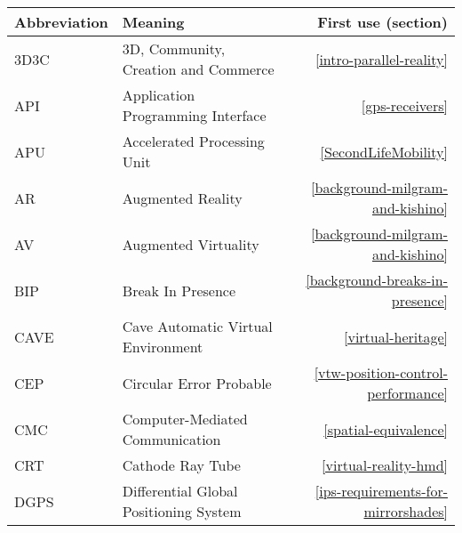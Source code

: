 
\begin{center}
\begin{longtable}{l p{8cm} r}




\toprule

\textbf{Abbreviation} & \centering \textbf{Meaning} & \textbf{First use (section)} \\

\midrule


3D3C & \centering 3D, Community, Creation and Commerce & \ref{intro-parallel-reality} \\

API & \centering Application Programming Interface & \ref{gps-receivers} \\

APU & \centering Accelerated Processing Unit & \ref{SecondLifeMobility} \\

AR & \centering Augmented Reality & \ref{background-milgram-and-kishino} \\

AV & \centering Augmented Virtuality & \ref{background-milgram-and-kishino} \\

BIP & \centering Break In Presence & \ref{background-breaks-in-presence} \\

CAVE & \centering Cave Automatic Virtual Environment & \ref{virtual-heritage} \\

CEP & \centering Circular Error Probable & \ref{vtw-position-control-performance} \\

CMC & \centering Computer-Mediated Communication & \ref{spatial-equivalence} \\

CRT & \centering Cathode Ray Tube & \ref{virtual-reality-hmd} \\

DGPS & \centering Differential Global Positioning System & \ref{ips-requirements-for-mirrorshades} \\


\end{longtable}
\end{center}
